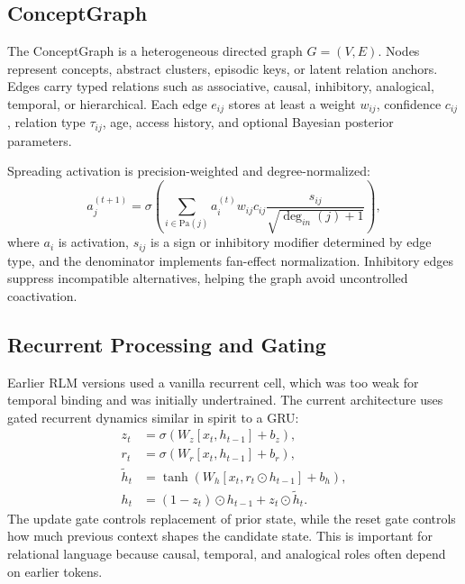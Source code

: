 \documentclass[11pt]{article}
\begin{document}
\subsection{ConceptGraph}
The ConceptGraph is a heterogeneous directed graph $G=(V,E)$. Nodes represent concepts, abstract clusters, episodic keys, or latent relation anchors. Edges carry typed relations such as associative, causal, inhibitory, analogical, temporal, or hierarchical. Each edge $e_{ij}$ stores at least a weight $w_{ij}$, confidence $c_{ij}$, relation type $\tau_{ij}$, age, access history, and optional Bayesian posterior parameters.

Spreading activation is precision-weighted and degree-normalized:
\begin{equation}
 a_j^{(t+1)} = \sigma\left( \sum_{i \in \mathrm{Pa}(j)} a_i^{(t)} w_{ij} c_{ij} \frac{s_{ij}}{\sqrt{\deg_{in}(j)+1}} \right),
\end{equation}
where $a_i$ is activation, $s_{ij}$ is a sign or inhibitory modifier determined by edge type, and the denominator implements fan-effect normalization. Inhibitory edges suppress incompatible alternatives, helping the graph avoid uncontrolled coactivation.

\subsection{Recurrent Processing and Gating}
Earlier RLM versions used a vanilla recurrent cell, which was too weak for temporal binding and was initially undertrained. The current architecture uses gated recurrent dynamics similar in spirit to a GRU:
\begin{align}
 z_t &= \sigma(W_z [x_t,h_{t-1}] + b_z),\\
 r_t &= \sigma(W_r [x_t,h_{t-1}] + b_r),\\
 \tilde{h}_t &= \tanh(W_h [x_t,r_t \odot h_{t-1}] + b_h),\\
 h_t &= (1-z_t)\odot h_{t-1} + z_t\odot \tilde{h}_t.
\end{align}
The update gate controls replacement of prior state, while the reset gate controls how much previous context shapes the candidate state. This is important for relational language because causal, temporal, and analogical roles often depend on earlier tokens.
\end{document}
